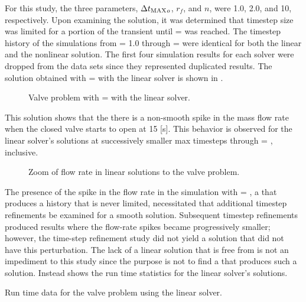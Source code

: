 For this study, the three parameters, $\dtmax{}_{o}$, $r_{f}$, and $n$, were 1.0, 2.0, and 10, respectively.
Upon examining the solution, it was determined that timestep size was \dtcrnt{} limited for a portion of the transient until \dtmax{} =  was reached.
The timestep history of the simulations from \dtmax{} = 1.0 through \dtmax{} =  were identical for both the linear and the nonlinear solution.
The first four simulation results for each solver were dropped from the data sets since they represented duplicated results.
The solution obtained with \dtmax{} =  with the linear solver is shown in .

\begin{figure}[h!t]
\centering

\caption{Valve problem with \dtmax{} =  with the linear solver.}
\label{fig:valveLin6pt25em02}
\end{figure}

This solution shows that the there is a non-smooth spike in the mass flow rate when the closed valve starts to open at 15 [s].
This behavior is observed for the linear solver's solutions at successively smaller max timesteps through \dtmax{} = , inclusive.

\begin{figure}[h!t]
\centering

\label{fig:valveLinSols}
\caption{Zoom of flow rate in linear solutions to the valve problem.}
\end{figure}

The presence of the spike in the flow rate in the simulation with \dtmax{} = , a \dtmax{} that produces a \dt{} history that is never \dtcrnt{} limited, necessitated that additional timestep refinements be examined for a smooth solution.
Subsequent timestep refinements produced results where the flow-rate spikes became progressively smaller; however, the time-step refinement study did not yield a solution that did not have this perturbation.
The lack of a linear solution that is free from is not an impediment to this study since the purpose is not to find a \dtmax{} that produces such a solution.
Instead  shows the run time statistics for the linear solver's solutions.

\begin{table}[h!t]
\centering
\singlespace

\caption{Run time data for the valve problem using the linear solver.}
\label{tab:valveLinDataTable}
\end{table}

